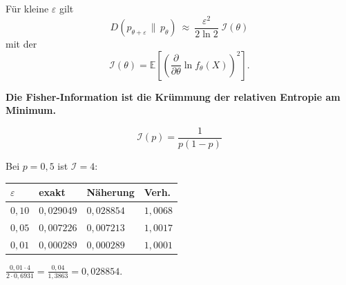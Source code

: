 \begin{merksatz}
Für kleine $\varepsilon$ gilt
\[ D(p_{\theta+\varepsilon}\,\|\,p_{\theta}) \ \approx\ \frac{\varepsilon^{2}}{2\ln 2}\;\mathcal{I}(\theta) \]
mit der 
\[ \mathcal{I}(\theta) = \mathbb{E}\left[\left(\frac{\partial}{\partial\theta}\ln f_\theta(X)\right)^{2}\right] . \]

\begin{center}
\begin{minipage}{0.9\textwidth}
\textbf{Die Fisher-Information ist die Krümmung der relativen Entropie am Minimum.}
\end{minipage}
\end{center}

\[ \mathcal{I}(p) = \frac{1}{p(1-p)} \]

Bei $p = 0{,}5$ ist $\mathcal{I} = 4$:
\begin{center}
{\small
\renewcommand{\arraystretch}{1.48}
\begin{tabular}{@{}P{1.6cm}P{2.4cm}P{2.4cm}P{1.6cm}@{}}
\toprule
$\varepsilon$ & \textbf{exakt} & \textbf{Näherung} & \textbf{Verh.}\\
\midrule
$0{,}10$ & $0{,}029049$ & $0{,}028854$ & $1{,}0068$\\
$0{,}05$ & $0{,}007226$ & $0{,}007213$ & $1{,}0017$\\
$0{,}01$ & $0{,}000289$ & $0{,}000289$ & $1{,}0001$\\
\bottomrule
\end{tabular}}
\end{center}

 $\frac{0{,}01\cdot4}{2\cdot0{,}6931} = \frac{0{,}04}{1{,}3863} = 0{,}028854$. \checkmark
\end{merksatz}

